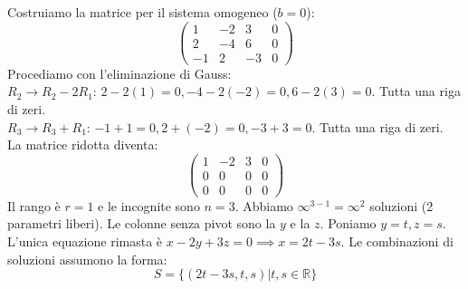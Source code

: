 \begin{solbox}
Costruiamo la matrice per il sistema omogeneo ($b=0$):
$$ \left(\begin{array}{ccc|c} 1 & -2 & 3 & 0 \\ 2 & -4 & 6 & 0 \\ -1 & 2 & -3 & 0 \end{array}\right) $$
Procediamo con l'eliminazione di Gauss: \\
$R_2 \to R_2 - 2R_1$: $2 - 2(1) = 0, -4 - 2(-2) = 0, 6 - 2(3) = 0$. Tutta una riga di zeri.\\
$R_3 \to R_3 + R_1$: $-1 + 1 = 0, 2 + (-2) = 0, -3 + 3 = 0$. Tutta una riga di zeri.\\
La matrice ridotta diventa:
$$ \left(\begin{array}{ccc|c} 1 & -2 & 3 & 0 \\ 0 & 0 & 0 & 0 \\ 0 & 0 & 0 & 0 \end{array}\right) $$
Il rango è $r=1$ e le incognite sono $n=3$. Abbiamo $\infty^{3-1} = \infty^2$ soluzioni (2 parametri liberi).
Le colonne senza pivot sono la $y$ e la $z$. Poniamo $y=t, z=s$.
L'unica equazione rimasta è $x - 2y + 3z = 0 \implies x = 2t - 3s$.
Le combinazioni di soluzioni assumono la forma:
$$ S = \{ (2t-3s, t, s) \vert t,s \in \mathbb{R} \} $$
\end{solbox}
